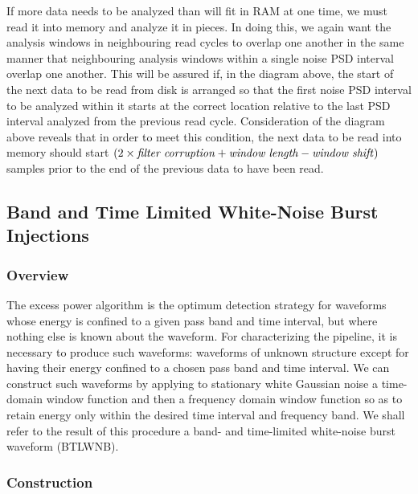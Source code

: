 \documentclass[10pt]{article}
\newcommand{\parm}[1]{\textit{#1}}
\begin{document}
If more data needs to be analyzed than will fit in RAM at one time, we must
read it into memory and analyze it in pieces.  In doing this, we again want
the analysis windows in neighbouring read cycles to overlap one another in
the same manner that neighbouring analysis windows within a single noise
PSD interval overlap one another.  This will be assured if, in the diagram
above, the start of the next data to be read from disk is arranged so that
the first noise PSD interval to be analyzed within it starts at the correct
location relative to the last PSD interval analyzed from the previous read
cycle.  Consideration of the diagram above reveals that in order to meet
this condition, the next data to be read into memory should start $(2
\times \mbox{\parm{filter corruption}} + \mbox{\parm{window length}} -
\mbox{\parm{window shift}})$ samples prior to the end of the previous data
to have been read.


\subsection{Band and Time Limited White-Noise Burst Injections}




\subsubsection{Overview}


The excess power algorithm is the optimum detection strategy for waveforms
whose energy is confined to a given pass band and time interval, but where
nothing else is known about the waveform.  For characterizing the pipeline,
it is necessary to produce such waveforms:  waveforms of unknown structure
except for having their energy confined to a chosen pass band and time
interval.  We can construct such waveforms by applying to stationary white
Gaussian noise a time-domain window function and then a frequency domain
window function so as to retain energy only within the desired time
interval and frequency band.  We shall refer to the result of this
procedure a band- and time-limited white-noise burst waveform (BTLWNB).


\subsubsection{Construction}
\end{document}
